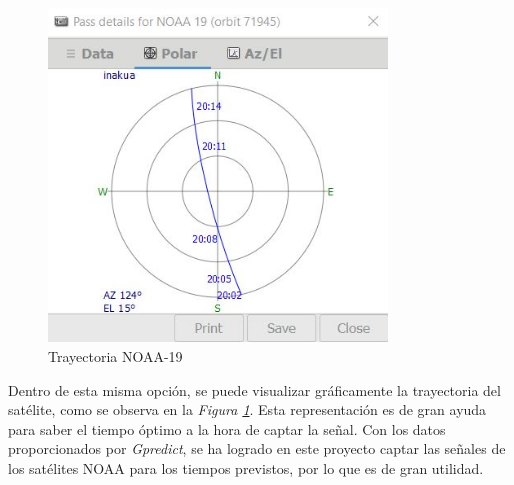 \documentclass[a4paper,openright,12pt]{article}
\begin{document}
	\begin{figure}[hbtp]
 \centering
 \includegraphics[width = 9cm]{imagenes/future_passes.JPG}
 \caption{Trayectoria NOAA-19}
 \label{trayectoria}
 \end{figure}
 
 
  Dentro de esta misma opción, se puede visualizar gráficamente la trayectoria del satélite, como se observa en la \textit{Figura \ref{trayectoria}}. Esta representación es de gran ayuda para saber el tiempo óptimo a la hora de captar la señal. Con los datos proporcionados por \textit{Gpredict}, se ha logrado en este proyecto captar las señales de los satélites NOAA para los tiempos previstos, por lo que es de gran utilidad.
\end{document}

